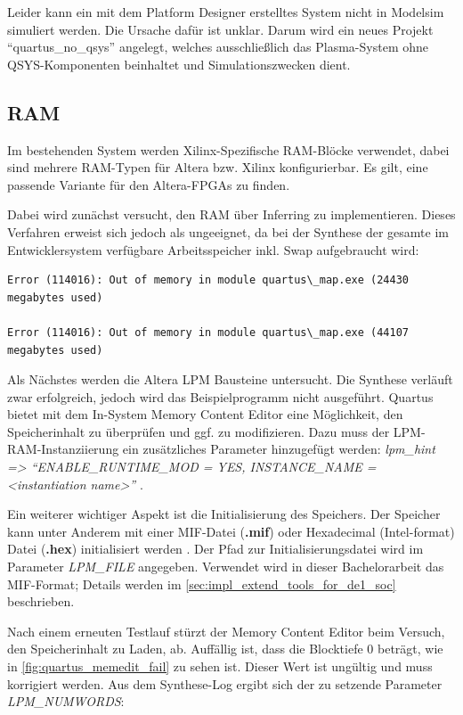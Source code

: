 Leider kann ein mit dem Platform Designer erstelltes System nicht in Modelsim simuliert werden. Die Ursache dafür ist unklar. Darum wird ein neues Projekt \enquote{quartus\_no\_qsys} angelegt, welches ausschließlich das Plasma-System ohne QSYS-Komponenten beinhaltet und Simulationszwecken dient. 


\subsection{RAM}
Im bestehenden System werden Xilinx-Spezifische \gls{RAM}-Blöcke verwendet, dabei sind mehrere \gls{RAM}-Typen für Altera bzw. Xilinx konfigurierbar. Es gilt, eine passende Variante für den Altera-\glspl{FPGA} zu finden. 

Dabei wird zunächst versucht, den \gls{RAM} über \gls{Inferring} zu implementieren. Dieses Verfahren erweist sich jedoch als ungeeignet, da bei der Synthese der gesamte im Entwicklersystem verfügbare Arbeitsspeicher inkl. Swap aufgebraucht wird:

\begin{verbatim}
Error (114016): Out of memory in module quartus\_map.exe (24430 megabytes used)

Error (114016): Out of memory in module quartus\_map.exe (44107 megabytes used) 
\end{verbatim}

Als Nächstes werden die Altera \Gls{LPM} Bausteine untersucht. Die Synthese verläuft zwar erfolgreich, jedoch wird das Beispielprogramm nicht ausgeführt. Quartus bietet mit dem In-System Memory Content Editor \cite{manual:memedit} eine Möglichkeit, den Speicherinhalt zu überprüfen und ggf. zu modifizieren. Dazu muss der \gls{LPM}-\gls{RAM}-Instanziierung ein zusätzliches Parameter hinzugefügt werden: \textit{lpm\_hint => \enquote{ENABLE\_RUNTIME\_MOD = YES, INSTANCE\_NAME = <instantiation name>}} \cite[15-2]{manual:memedit}.

Ein weiterer wichtiger Aspekt ist die Initialisierung des Speichers. Der Speicher kann unter Anderem mit einer \Gls{MIF}-Datei (\textbf{.mif}) oder Hexadecimal (Intel-format) Datei (\textbf{.hex}) initialisiert werden \cite[4-18]{manual:ug_ram}. Der Pfad zur Initialisierungsdatei wird im Parameter \textit{LPM\_FILE} angegeben. Verwendet wird in dieser Bachelorarbeit das MIF-Format; Details werden im \cref{sec:impl_extend_tools_for_de1_soc} beschrieben. 

 Nach einem erneuten Testlauf stürzt der Memory Content Editor beim Versuch, den Speicherinhalt zu Laden, ab. Auffällig ist, dass die Blocktiefe 0 beträgt, wie in \cref{fig:quartus_memedit_fail} zu sehen ist. Dieser Wert ist ungültig \cite[4-9]{manual:ug_ram} und muss korrigiert werden. Aus dem Synthese-Log ergibt sich der zu setzende Parameter \textit{LPM\_NUMWORDS}:

